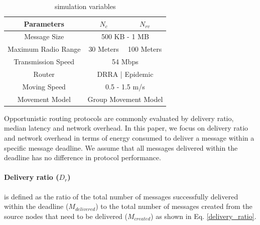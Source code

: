 \begin{table}[!t]
	\renewcommand{\arraystretch}{1.3}
	\caption{simulation variables}
	\label{table_parameters}
	\centering
	\begin{tabular}{|c|c|c|}
		\hline
		Parameters         &  $N_{c}$ & $N_{rv}$ \\ \hline
		Message Size       &  \multicolumn{2}{|c|}{500 KB - 1 MB}        \\ \hline
		Maximum Radio Range & 30 Meters  & 100 Meters \\ \hline
		Transmission Speed &  \multicolumn{2}{|c|}{ 54 Mbps   }        \\ \hline
		Router             & \multicolumn{2}{|c|}{ DRRA | Epidemic   } \\ \hline
		Moving Speed       &   \multicolumn{2}{|c|}{0.5 - 1.5 m/s }        \\ \hline
		Movement Model     &   \multicolumn{2}{|c|}{Group Movement Model  }      \\ \hline
	\end{tabular}
\end{table}

Opportunistic routing protocols are commonly evaluated by delivery ratio, median latency and network overhead.
In this paper, we focus on delivery ratio and network overhead in terms of energy consumed to deliver a message within a specific message deadline.
We assume that all messages delivered within the deadline has no difference in protocol performance.


\paragraph{Delivery ratio ($D_{r}$)} 
is defined as the ratio of the total number of messages successfully delivered within the deadline ($ { M }_{ delivered }$) to the total number of messages created from the source nodes that need to be delivered ($ { M }_{ created }$) as shown in Eq. \ref{delivery_ratio}.

